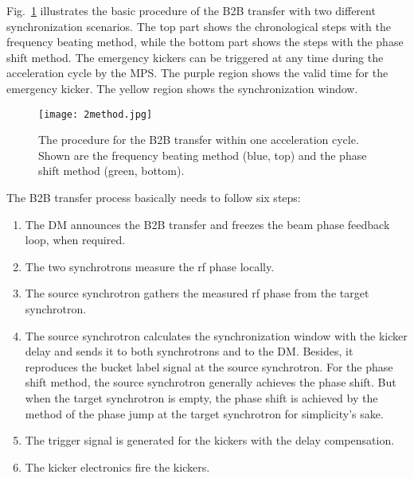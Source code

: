 Fig.~\ref{2method} illustrates the basic procedure of the B2B transfer with two different synchronization scenarios. The top part shows the chronological steps with the frequency beating method, while the bottom part shows the steps with the phase shift method. The emergency kickers can be triggered at any time during the acceleration cycle by the MPS. The purple region shows the valid time for the emergency kicker. The yellow region shows the synchronization window. 
\begin{figure}[H]
   \centering   
   \texttt{[image: 2method.jpg]}
   \caption{The procedure for the B2B transfer within one acceleration cycle. Shown are the frequency beating method (blue, top) and the phase shift method (green, bottom).}
   \label{2method}
\end{figure}

The B2B transfer process basically needs to follow six steps:
\begin{enumerate}
\item The DM announces the B2B transfer and freezes the beam phase feedback loop, when required.
\item The two synchrotrons measure the rf phase locally.
\item The source synchrotron gathers the measured rf phase from the target synchrotron.
\item The source synchrotron calculates the synchronization window with the kicker delay and sends it to both synchrotrons and to the DM. Besides, it reproduces the bucket label signal at the source synchrotron.
For the phase shift method, the source synchrotron generally achieves the phase shift. But when the target synchrotron is empty, the phase shift is achieved by the method of the phase jump at the target synchrotron for simplicity's sake.
\item The trigger signal is generated for the kickers with the delay compensation.
\item The kicker electronics fire the kickers.
\end{enumerate}

